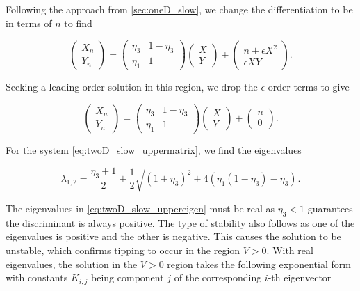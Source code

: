 Following the approach from \autoref{sec:oneD_slow}, we change the differentiation to be in terms of $n$ to find

\begin{equation*}
\begin{pmatrix}
X_n\\
Y_n
\end{pmatrix}=
\begin{pmatrix}
\eta_3 & 1-\eta_3 \\ 
\eta_1 & 1
\end{pmatrix}
\begin{pmatrix}
X\\
Y
\end{pmatrix} +
\begin{pmatrix}
n+\epsilon X^2\\
\epsilon XY
\end{pmatrix}.
\end{equation*}

Seeking a leading order solution in this region, we drop the $\epsilon$ order terms to give 

\begin{equation}\label{eq:twoD_slow_uppermatrix}
\begin{pmatrix}
X_n\\
Y_n
\end{pmatrix}=
\begin{pmatrix}
\eta_3 & 1-\eta_3 \\ 
\eta_1 & 1
\end{pmatrix}
\begin{pmatrix}
X\\
Y
\end{pmatrix} +
\begin{pmatrix}
n\\
0
\end{pmatrix}.
\end{equation}

For the system \eqref{eq:twoD_slow_uppermatrix}, we find the eigenvalues

\begin{equation}\label{eq:twoD_slow_uppereigen}
\lambda_{1,2}=\frac{\eta_3+1}{2}\pm\frac{1}{2}\sqrt{(1+\eta_3)^2+4(\eta_1(1-\eta_3)-\eta_3)}.
\end{equation}

\indent The eigenvalues in \eqref{eq:twoD_slow_uppereigen} must be real as $\eta_3<1$ guarantees the discriminant is always positive. The type of stability also follows as one of the eigenvalues is positive and the other is negative. This causes the solution to be unstable, which confirms tipping to occur in the region $V>0$. With real eigenvalues, the solution in the $V>0$ region takes the following exponential form with constants $K_{i,j}$ being component $j$ of the corresponding $i$-th eigenvector 

